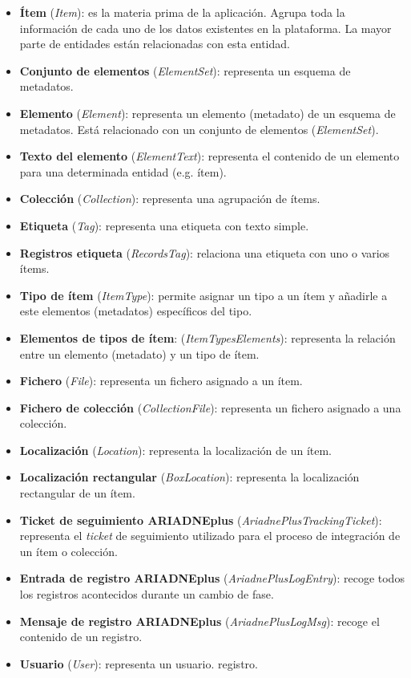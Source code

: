 \begin{itemize}
\tightlist
\item
  \textbf{Ítem} (\emph{Item}): es la materia prima de la aplicación.
  Agrupa toda la información de cada uno de los datos existentes en la
  plataforma. La mayor parte de entidades están relacionadas con esta
  entidad.
\item
  \textbf{Conjunto de elementos} (\emph{ElementSet}): representa un
  esquema de metadatos.
\item
  \textbf{Elemento} (\emph{Element}): representa un elemento (metadato)
  de un esquema de metadatos. Está relacionado con un conjunto de
  elementos (\emph{ElementSet}).
\item
  \textbf{Texto del elemento} (\emph{ElementText}): representa el
  contenido de un elemento para una determinada entidad (e.g. ítem).
\item
  \textbf{Colección} (\emph{Collection}): representa una agrupación de
  ítems.
\item
  \textbf{Etiqueta} (\emph{Tag}): representa una etiqueta con texto
  simple.
\item
  \textbf{Registros etiqueta} (\emph{RecordsTag}): relaciona una
  etiqueta con uno o varios ítems.
\item
  \textbf{Tipo de ítem} (\emph{ItemType}): permite asignar un tipo a un
  ítem y añadirle a este elementos (metadatos) específicos del tipo.
\item
  \textbf{Elementos de tipos de ítem}: (\emph{ItemTypesElements}):
  representa la relación entre un elemento (metadato) y un tipo de ítem.
\item
  \textbf{Fichero} (\emph{File}): representa un fichero asignado a un
  ítem.
\item
  \textbf{Fichero de colección} (\emph{CollectionFile}): representa un
  fichero asignado a una colección.
\item
  \textbf{Localización} (\emph{Location}): representa la localización de
  un ítem.
\item
  \textbf{Localización rectangular} (\emph{BoxLocation}): representa la
  localización rectangular de un ítem.
\item
  \textbf{Ticket de seguimiento ARIADNEplus} (\emph{AriadnePlusTrackingTicket}): representa
  el \emph{ticket} de seguimiento utilizado para el proceso de integración de un ítem o colección.
\item
  \textbf{Entrada de registro ARIADNEplus} (\emph{AriadnePlusLogEntry}): recoge todos los registros
  acontecidos durante un cambio de fase.
\item
  \textbf{Mensaje de registro ARIADNEplus} (\emph{AriadnePlusLogMsg}): recoge el contenido de un
  registro.
\item
  \textbf{Usuario} (\emph{User}): representa un usuario.
  registro.
\end{itemize}

